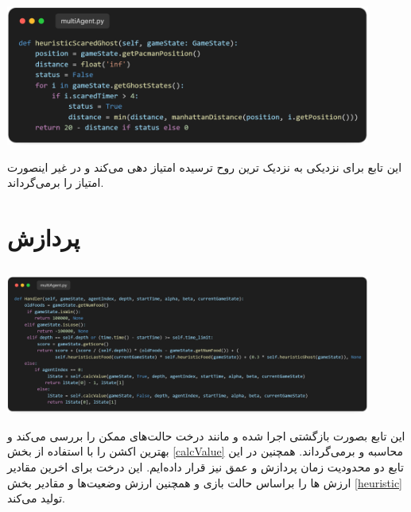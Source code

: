 \documentclass[12pt, dvipsnames, svgnames, x11names,]{article}
\begin{document}
			
		\subsection{}
		
			\begin{center}
				\includegraphics[width=12cm]{images/04}
			\end{center}
			
			{\normalsize این تابع برای نزدیکی به نزدیک ترین روح ترسیده امتیاز دهی می‌کند و در غیر اینصورت امتیاز  را برمی‌گرداند.}
		
	
	\section{پردازش }
	
		\subsection{} \label{Handler}
	
			\begin{center}
				\includegraphics[width=12cm]{images/05}
			\end{center}
		
			{\normalsize این تابع بصورت بازگشتی اجرا شده و مانند درخت  حالت‌های ممکن را بررسی می‌کند و بهترین اکشن را با استفاده از بخش \ref{calcValue} محاسبه و برمی‌گرداند. همچنین در این تابع دو محدودیت زمان پردازش و عمق نیز قرار داده‌ایم. این درخت برای اخرین مقادیر ارزش ها را براساس حالت بازی و همچنین ارزش وضعیت‌ها و مقادیر بخش \ref{heuristic} تولید می‌کند.}
		
\end{document}
